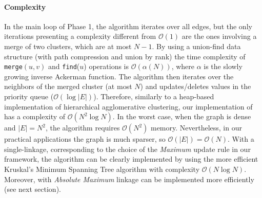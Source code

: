 \paragraph*{Complexity} 
In the main loop of Phase 1, the algorithm iterates over all edges, but the only iterations presenting a complexity different from $\mathcal{O}(1)$ are the ones involving a merge of two clusters, which are at most $N-1$. By using a union-find data structure (with path compression and union by rank) the time complexity of \texttt{merge}$(u, v)$ and \texttt{find}($u$) operations is $\mathcal{O}(\alpha(N))$, where $\alpha$ is the slowly growing inverse Ackerman function. The algorithm then iterates over the neighbors of the merged cluster (at most $N$) and updates/deletes values in the priority queue ($\mathcal{O}(\log |E|)$). 
Therefore, 
similarly to a heap-based implementation of hierarchical agglomerative clustering, our implementation of \algname{} has a complexity of $\mathcal{O}(N^2 \log N)$. In the worst case, when the graph is dense and $|E|=N^2$, the algorithm requires $\mathcal{O}(N^2)$ memory. Nevertheless, in our practical applications the graph is much sparser, so $\mathcal{O}(|E|)=\mathcal{O}(N)$. 
With a single-linkage, corresponding to the choice of the \emph{Maximum} update rule in our framework, the algorithm can be clearly implemented by using the more efficient Kruskal's Minimum Spanning Tree algorithm with complexity $\mathcal{O}(N \log N)$. 
Moreover, \algname{} with \emph{Absolute Maximum} linkage can be implemented more efficiently (see next section). %





